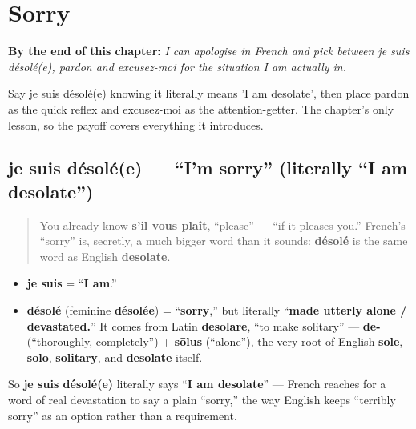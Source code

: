 
\chapter{Sorry}
\label{ch:fr-sorry}

\begin{chapteropening}
\textbf{By the end of this chapter:} \emph{I can apologise in French and pick between je suis désolé(e), pardon and excusez-moi for the situation I am actually in.}

Say je suis désolé(e) knowing it literally means 'I am desolate', then place pardon as the quick reflex and excusez-moi as the attention-getter. The chapter's only lesson, so the payoff covers everything it introduces.
\end{chapteropening}

\section[je suis désolé(e)]{je suis désolé(e) — \textquotedblleft{}I'm sorry\textquotedblright{} (literally \textquotedblleft{}I am desolate\textquotedblright{})}

\label{lesson:FR-C20-je-suis-desole}



\begin{quote}
You already know \textbf{s'il vous plaît}, \textquotedblleft{}please\textquotedblright{} — \textquotedblleft{}if it pleases you.\textquotedblright{} French's \textquotedblleft{}sorry\textquotedblright{} is, secretly, a much bigger word than it sounds: \textbf{désolé} is the same word as English \textbf{desolate}.
\end{quote}

\begin{cousinweb}
\begin{itemize}
\raggedright
  \item \textbf{je suis} = \textquotedblleft{}\textbf{I am}.\textquotedblright{}
  \item \textbf{désolé} (feminine \textbf{désolée}) = \textquotedblleft{}\textbf{sorry},\textquotedblright{} but literally \textquotedblleft{}\textbf{made utterly alone / devastated.}\textquotedblright{} It comes from Latin \textbf{dēsōlāre}, \textquotedblleft{}to make solitary\textquotedblright{} — \textbf{dē-} (\textquotedblleft{}thoroughly, completely\textquotedblright{}) + \textbf{sōlus} (\textquotedblleft{}alone\textquotedblright{}), the very root of English \textbf{sole}, \textbf{solo}, \textbf{solitary}, and \textbf{desolate} itself.
\end{itemize}

So \textbf{je suis désolé(e)} literally says \textquotedblleft{}\textbf{I am desolate}\textquotedblright{} — French reaches for a word of real devastation to say a plain \textquotedblleft{}sorry,\textquotedblright{} the way English keeps \textquotedblleft{}terribly sorry\textquotedblright{} as an option rather than a requirement.
\end{cousinweb}

